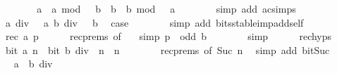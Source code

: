 \begin{isabellebody}
\ \ \ \ \isamarkupfalse%
\ \isamarkupfalse%
\ {\isacartoucheopen}a\ {\isacharplus}{\kern0pt}\ a\ mod\ {}\ {\isacharplus}{\kern0pt}\ b\ {\isacharequal}{\kern0pt}\ b\ {\isacharplus}{\kern0pt}\ b\ mod\ {}\ {\isacharplus}{\kern0pt}\ a{\isacartoucheclose}\isanewline
\ \ \ \ \ \ \isamarkupfalse%
\ {\isacharparenleft}{\kern0pt}simp\ add{\isacharcolon}{\kern0pt}\ ac{\isacharunderscore}{\kern0pt}simps{\isacharparenright}{\kern0pt}\isanewline
\ \ \ \ \isamarkupfalse%
\ {\isacartoucheopen}a\ div\ {}\ {\isacharequal}{\kern0pt}\ a{\isacartoucheclose}\ {\isacartoucheopen}b\ div\ {}\ {\isacharequal}{\kern0pt}\ b{\isacartoucheclose}\ \isamarkupfalse%
\ {\isacharquery}{\kern0pt}case\isanewline
\ \ \ \ \ \ \isamarkupfalse%
\ {\isacharparenleft}{\kern0pt}simp\ add{\isacharcolon}{\kern0pt}\ bits{\isacharunderscore}{\kern0pt}stable{\isacharunderscore}{\kern0pt}imp{\isacharunderscore}{\kern0pt}add{\isacharunderscore}{\kern0pt}self{\isacharparenright}{\kern0pt}\isanewline
\ \ \isamarkupfalse%
\isanewline
\ \ \ \ \isamarkupfalse%
\ {\isacharparenleft}{\kern0pt}rec\ a\ p{\isacharparenright}{\kern0pt}\isanewline
\ \ \ \ \isamarkupfalse%
\ rec{\isachardot}{\kern0pt}prems\ {\isacharbrackleft}{\kern0pt}of\ {}{\isacharbrackright}{\kern0pt}\ \isamarkupfalse%
\ {\isacharbrackleft}{\kern0pt}simp{\isacharbrackright}{\kern0pt}{\isacharcolon}{\kern0pt}\ {\isacartoucheopen}p\ {\isacharequal}{\kern0pt}\ odd\ b{\isacartoucheclose}\isanewline
\ \ \ \ \ \ \isamarkupfalse%
\ simp\isanewline
\ \ \ \ \isamarkupfalse%
\ rec{\isachardot}{\kern0pt}hyps\ \isamarkupfalse%
\ {\isacartoucheopen}bit\ a\ n\ {\isasymlongleftrightarrow}\ bit\ {\isacharparenleft}{\kern0pt}b\ div\ {}{\isacharparenright}{\kern0pt}\ n{\isacartoucheclose}\ \ n\isanewline
\ \ \ \ \ \ \isamarkupfalse%
\ rec{\isachardot}{\kern0pt}prems\ {\isacharbrackleft}{\kern0pt}of\ {\isacartoucheopen}Suc\ n{\isacartoucheclose}{\isacharbrackright}{\kern0pt}\ \isamarkupfalse%
\ {\isacharparenleft}{\kern0pt}simp\ add{\isacharcolon}{\kern0pt}\ bit{\isacharunderscore}{\kern0pt}Suc{\isacharparenright}{\kern0pt}\isanewline
\ \ \ \ \isamarkupfalse%
\ \isamarkupfalse%
\ {\isacartoucheopen}a\ {\isacharequal}{\kern0pt}\ b\ div\ {}{\isacartoucheclose}\isanewline
\ \ \ \ \ \ \isamarkupfalse%

\end{isabellebody}
